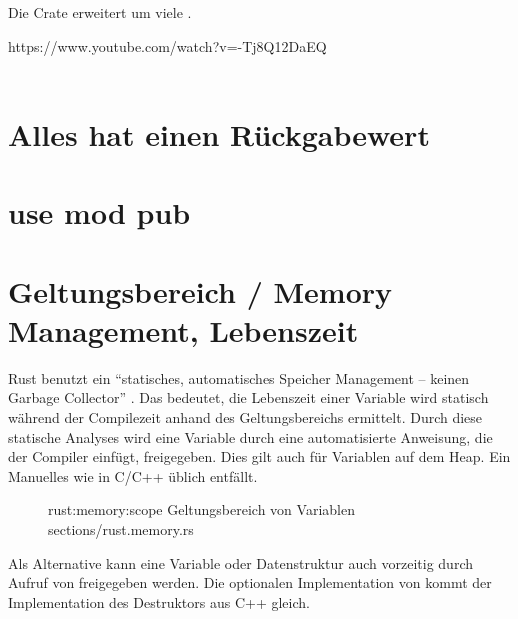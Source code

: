 Die Crate  erweitert  um viele .      




https://www.youtube.com/watch?v=-Tj8Q12DaEQ \\
 \\



\section{Alles hat einen Rückgabewert}

\section{use mod pub}


\section{Geltungsbereich / Memory Management, Lebenszeit}
\label{rust:scope}
\label{rust:static_analysis}

Rust benutzt ein \enquote{statisches, automatisches Speicher Management -- keinen Garbage Collector} \cite{rust:youtube:goto2017}.
Das bedeutet, die Lebenszeit einer Variable wird statisch während der Compilezeit anhand des Geltungsbereichs ermittelt.
Durch diese statische Analyses wird eine Variable durch eine automatisierte Anweisung, die der Compiler einfügt, freigegeben.
Dies gilt auch für Variablen auf dem Heap.
Ein Manuelles  wie in C/C++ üblich entfällt.


\begin{figure}[H]
	\rustcinclude
		{rust:memory:scope}
		{Geltungsbereich von Variablen}
		{sections/rust.memory.rs}
\end{figure}

Als Alternative kann eine Variable oder Datenstruktur auch vorzeitig durch Aufruf von  freigegeben werden.
Die optionalen Implementation von   kommt der Implementation des Destruktors aus C++ gleich.

